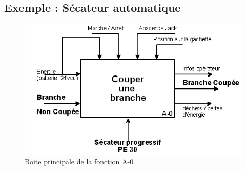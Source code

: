 \documentclass[
	11pt, %
	fleqn, %
	a4paper, %
]{LegrandOrangeBook}
\begin{document}
\subsection*{Exemple : Sécateur automatique}

\begin{figure}[H]
    \hfill%
    \begin{minipage}[c]{.46\linewidth}
        \centering
        \includegraphics[width=1.2\textwidth]{Images/seca1.png}
        \caption{Boite principale de la fonction A-0}
    \end{minipage}

\end{figure}
\end{document}
